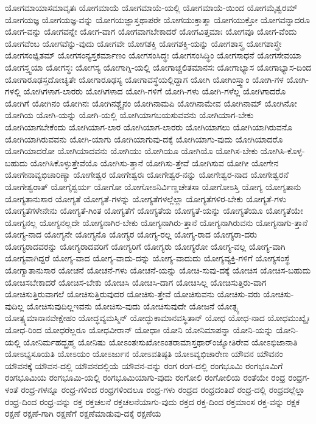 {ಯೋಗಮಾಯಾಸಮಾವೃತಃ
ಯೋಗಮಾಯೆ
ಯೋಗಮಾಯೆ-ಯಲ್ಲಿ
ಯೋಗಮಾಯೆ-ಯಿಂದ
ಯೋಗಮೈಶ್ವರಮ್
ಯೋಗಯಜ್ಞ
ಯೋಗಯಜ್ಞ-ವನ್ನು
ಯೋಗಯಜ್ಞಾಸ್ತಥಾಪರೇ
ಯೋಗಯುಕ್ತಾತ್ಮಾ
ಯೋಗಯುಕ್ತೋ
ಯೋಗವನ್ನಾದರೂ
ಯೋಗ-ವನ್ನು
ಯೋಗವನ್ನೇ
ಯೋಗ-ವಾಗ
ಯೋಗವಾಗಬೇಕಾದರೆ
ಯೋಗವಿತ್ತಮಾಃ
ಯೋಗವೂ
ಯೋಗ-ವೆಂದು
ಯೋಗವೆಂಬ
ಯೋಗವೆನ್ನು-ವುದು
ಯೋಗವೇ
ಯೋಗಶಕ್ತಿ
ಯೋಗಶಕ್ತಿ-ಯನ್ನು
ಯೋಗಶಾಸ್ತ್ರ
ಯೋಗಶಾಸ್ತ್ರೇ
ಯೋಗಸಂಜ್ಞಿತಮ್
ಯೋಗಸಂನ್ಯಸ್ತಕರ್ಮಾಣಂ
ಯೋಗಸಂಸಿದ್ಧಃ
ಯೋಗಸಂಸಿದ್ಧಿಂ
ಯೋಗಸಾಧನೆ
ಯೋಗಸೇವಯಾ
ಯೋಗಸ್ತ್ವಯಾ
ಯೋಗಸ್ಥಃ
ಯೋಗಸ್ಯ
ಯೋಗಾಗ್ನಿ-ಯಲ್ಲಿ
ಯೋಗಾಚ್ಚಲಿತಮಾನಸಃ
ಯೋಗಾಭ್ಯಾಸ
ಯೋಗಾಭ್ಯಾಸ-ದಿಂದ
ಯೋಗಾರೂಢಸ್ತದೋಚ್ಯತೇ
ಯೋಗಾರೂಢಸ್ಯ
ಯೋಗಾವಸ್ಥೆಯಲ್ಲಿದ್ದಾಗ
ಯೋಗಿ
ಯೋಗಿಂಸ್ತ್ವಾಂ
ಯೋಗಿ-ಗಳ
ಯೋಗಿ-ಗಳಲ್ಲಿ
ಯೋಗಿಗಳಾಗ-ಲಾರರು
ಯೋಗಿಗಳಾದ
ಯೋಗಿ-ಗಳಿಗೆ
ಯೋಗಿ-ಗಳು
ಯೋಗಿ-ಗಳೆಲ್ಲ
ಯೋಗಿಗಾದರೊ
ಯೋಗಿಗೆ
ಯೋಗಿನಂ
ಯೋಗಿನಃ
ಯೋಗಿನಶ್ಚೈನಂ
ಯೋಗಿನಾಮಪಿ
ಯೋಗಿನಾಮೇವ
ಯೋಗಿನಾಮ್
ಯೋಗಿನೋ
ಯೋಗಿಯ
ಯೋಗಿ-ಯನ್ನು
ಯೋಗಿ-ಯಲ್ಲಿ
ಯೋಗಿಯಾಗಬಯಸುವವನು
ಯೋಗಿಯಾಗ-ಬೇಕು
ಯೋಗಿಯಾಗಬೇಕೆಂದು
ಯೋಗಿಯಾಗ-ಲಾರ
ಯೋಗಿಯಾಗ-ಲಾರರು
ಯೋಗಿಯಾಗಲು
ಯೋಗಿಯಾಗಿರುವನೊ
ಯೋಗಿಯಾಗಿರುವವನು
ಯೋಗಿ-ಯಾಗು
ಯೋಗಿಯಾಗುವು-ದಕ್ಕೆ
ಯೋಗಿಯಾಗು-ವುದು
ಯೋಗಿಯಾದರೊ
ಯೋಗಿಯಾದರೋ
ಯೋಗಿಯಾದವನು
ಯೋಗಿಯು
ಯೋಗಿಯೂ
ಯೋಗಿಯೊ
ಯೋಗಿಸ-ಬೇಕು
ಯೋಗಿಸಿ-ಕೊಳ್ಳ-ಬಹುದು
ಯೋಗಿಸಿಕೊಳ್ಳುತ್ತೇವೆಯೊ
ಯೋಗಿಸು-ತ್ತಾನೆ
ಯೋಗಿಸು-ತ್ತೇವೆ
ಯೋಗಿಸುವ
ಯೋಗೀ
ಯೋಗೇನ
ಯೋಗೇನಾವ್ಯಭಿಚಾರಿಣ್ಯಾ
ಯೋಗೇಶ್ವರ
ಯೋಗೇಶ್ವರಃ
ಯೋಗೇಶ್ವರ-ನನ್ನು
ಯೋಗೇಶ್ವರ-ನಾದ
ಯೋಗೇಶ್ವರನೆ
ಯೋಗೇಶ್ವರಾತ್
ಯೋಗೈಶ್ವರ್ಯ
ಯೋಗೋ
ಯೋಗೋಽನಿರ್ವಿಣ್ಣಚೇತಸಾ
ಯೋಗೋಽಸ್ತಿ
ಯೋಗ್ಯ
ಯೋಗ್ಯತಾನು
ಯೋಗ್ಯತಾನುಸಾರ
ಯೋಗ್ಯತೆ
ಯೋಗ್ಯತೆ-ಗಳನ್ನು
ಯೋಗ್ಯತೆಗಳಲ್ಲೆಲ್ಲಾ
ಯೋಗ್ಯತೆಗಳಿರ-ಬೇಕು
ಯೋಗ್ಯತೆ-ಗಳು
ಯೋಗ್ಯತೆಗಳೇನೇನು
ಯೋಗ್ಯತೆ-ಗಿಂತ
ಯೋಗ್ಯತೆಗೆ
ಯೋಗ್ಯತೆಯ
ಯೋಗ್ಯತೆ-ಯನ್ನು
ಯೋಗ್ಯತೆಯೂ
ಯೋಗ್ಯತೆಯೇ
ಯೋಗ್ಯನಲ್ಲ
ಯೋಗ್ಯನಲ್ಲದೇ
ಯೋಗ್ಯನಾಗಿರ-ಬೇಕು
ಯೋಗ್ಯನಾಗಿರು-ತ್ತಾನೆ
ಯೋಗ್ಯನಾಗಿರುವನು
ಯೋಗ್ಯನಾಗು-ತ್ತಾನೆ
ಯೋಗ್ಯ-ನಾದ
ಯೋಗ್ಯನೇ
ಯೋಗ್ಯನೊ
ಯೋಗ್ಯರ
ಯೋಗ್ಯ-ರಲ್ಲ
ಯೋಗ್ಯ-ರಾದ
ಯೋಗ್ಯರಾ-ದರು
ಯೋಗ್ಯರಾದವರನ್ನು
ಯೋಗ್ಯರಾದವರಿಗೆ
ಯೋಗ್ಯರಿಗೆ
ಯೋಗ್ಯರು
ಯೋಗ್ಯರೋ
ಯೋಗ್ಯ-ವಲ್ಲ
ಯೋಗ್ಯ-ವಾಗಿ
ಯೋಗ್ಯವಾಗಿದ್ದರೆ
ಯೋಗ್ಯ-ವಾದ
ಯೋಗ್ಯ-ವಾದು-ದನ್ನು
ಯೋಗ್ಯ-ವಾದುದು
ಯೋಗ್ಯವ್ಯಕ್ತಿ-ಗಳಿಗೆ
ಯೋಗ್ಯಸಂಸ್ಥೆ
ಯೋಗ್ಯಾತಾನುಸಾರ
ಯೋಚನೆ
ಯೋಚನೆ-ಗಳು
ಯೋಚನೆ-ಯನ್ನು
ಯೋಚಿ-ಸುವು-ದಕ್ಕೆ
ಯೋಚಿಸ
ಯೋಚಿಸ-ಬಹುದು
ಯೋಚಿಸಬೇಕಾದರೆ
ಯೋಚಿಸ-ಬೇಕು
ಯೋಚಿಸಿ
ಯೋಚಿಸಿ-ದಾಗ
ಯೋಚಿಸಿಲ್ಲ
ಯೋಚಿಸುತ್ತಿರು-ವಾಗ
ಯೋಚಿಸುತ್ತಿರುವಾಗಲೆ
ಯೋಚಿಸುತ್ತಿರುವುದರ
ಯೋಚಿಸು-ತ್ತೇವೆ
ಯೋಚಿಸುವನು
ಯೋಚಿಸು-ವರು
ಯೋಚಿಸು-ವುದಿಲ್ಲ
ಯೋಚಿಸುವುದಿಲ್ಲಇವನು
ಯೋಚಿಸು-ವುದು
ಯೋಚಿಸುವುದೇ
ಯೋಜನೆ
ಯೋತ್ಸ್ಯ
ಯೋತ್ಸ್ಯಮಾನಾನವೇಕ್ಷೇಹಂ
ಯೋದ್ಧವ್ಯಮಸ್ಮಿನ್
ಯೋದ್ಧುಕಾಮಾನವಸ್ಥಿತಾನ್
ಯೋಧ
ಯೋಧ-ನಾದ
ಯೋಧಮುಖ್ಯೈಃ
ಯೋಧ-ರಿಂದ
ಯೋಧರೆಲ್ಲರೂ
ಯೋಧವೀರಾನ್
ಯೋಧಾಃ
ಯೋನಿ
ಯೋನಿಮಾಪನ್ನಾ
ಯೋನಿ-ಯನ್ನು
ಯೋನಿ-ಯಲ್ಲಿ
ಯೋನಿರ್ಮಹದ್ಬ್ರಹ್ಮ
ಯೋನಿಷು
ಯೋಽಂತಃಸುಖೋಽಂತರಾಮಾಸ್ತಥಾರ್ಂಜ್ಯೋತಿರೇವ
ಯೋಽಭಿಜಾನಾತಿ
ಯೋಽಭ್ಯಸೂಯತಿ
ಯೋಽಯಂ
ಯೋಽರ್ಜುನ
ಯೋಽವತಿಷ್ಠತಿ
ಯೋಽವ್ಯಭಿಚಾರೇಣ
ಯೌವನ
ಯೌವನಂ
ಯೌವನಕ್ಕೆ
ಯೌವನ-ದಲ್ಲಿ
ಯೌವನದಲ್ಲಿಯೆ
ಯೌವನ-ವನ್ನು
ರಂಗ
ರಂಗ-ದಲ್ಲಿ
ರಂಗಭೂಮಿ
ರಂಗಭೂಮಿಗೆ
ರಂಗಭೂಮಿಯ
ರಂಗಭೂಮಿ-ಯಲ್ಲಿ
ರಂಗಭೂಮಿಯಾಗು-ವುದು
ರಂಗೋಲಿ
ರಂಗೋಲಿಯ
ರಂತೆಯೇ
ರಂಧ್ರ
ರಂಧ್ರಗ-ಳಂತೆ
ರಂಧ್ರ-ಗಳನ್ನೂ
ರಂಧ್ರ-ಗಳಿಂದ
ರಂಧ್ರಗಳಿಂದಲೂ
ರಂಧ್ರ-ಗಳು
ರಂಧ್ರದ
ರಂಧ್ರದಂತಿದೆ
ರಂಧ್ರ-ದಲ್ಲಿ
ರಂಧ್ರದಲ್ಲೆಲ್ಲಾ
ರಂಧ್ರ-ದಿಂದ
ರಂಧ್ರ-ವನ್ನು
ರಕ್ತ
ರಕ್ತಚಲನೆ
ರಕ್ತಚಲನೆಯಾಗು-ವುದು
ರಕ್ತದ
ರಕ್ತ-ದಿಂದ
ರಕ್ತಮಾಂಸ
ರಕ್ತ-ವನ್ನು
ರಕ್ಷಕ
ರಕ್ಷಣೆ
ರಕ್ಷಣೆ-ಗಾಗಿ
ರಕ್ಷಣೆಗೆ
ರಕ್ಷಣೆಮಾಡುವು-ದಕ್ಕೆ
ರಕ್ಷಣೆಯ
}
